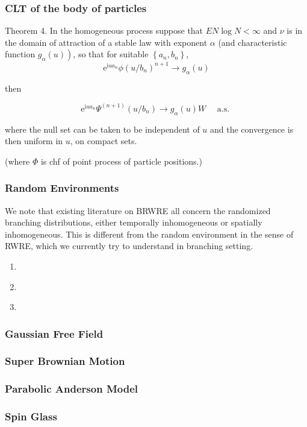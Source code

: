\subsubsection{CLT of the body of particles}

\begin{tcolorbox}[title=,colback=gray!10,colframe=black,breakable]
    Theorem 4. \autocite{bigginsCentralLimit1990} In the homogeneous process suppose that $E N \log N<\infty$ and $\nu$ is in the domain of attraction of a stable law with exponent $\alpha$ (and characteristic function $\left.g_\alpha(u)\right)$, so that for suitable $\left\{a_n, b_n\right\}$,
\[
\mathrm{e}^{\mathrm{i} u a_n} \phi\left(u / b_n\right)^{n+1} \rightarrow g_\alpha(u)
\]

then

\[
\mathrm{e}^{\mathrm{i} u a_n} \Psi^{(n+1)}\left(u / b_n\right) \rightarrow g_\alpha(u) W \quad \text { a.s. }
\]

where the null set can be taken to be independent of $u$ and the convergence is then uniform in $u$, on compact sets.

(where $\Phi$ is chf of point process of particle positions.)
\end{tcolorbox}


\subsubsection{Random Environments}

\begin{tcolorbox}[title=,colback=blue!10,colframe=black,breakable]
We note that existing literature on BRWRE all concern the randomized branching distributions, either temporally inhomogeneous or spatially inhomogeneous. 
This is different from the random environment in the sense of RWRE, which we currently try to understand in branching setting.
\end{tcolorbox}

\begin{enumerate}
    \item \autocite{bramsonTightness2009} 
    \item \autocite{fangTightnessMaxima2012}
    \item \autocite{fangBranchingRandom2012}
\end{enumerate}

\subsubsection{Gaussian Free Field}

\subsubsection{Super Brownian Motion}

\subsubsection{Parabolic Anderson Model}

\subsubsection{Spin Glass}

